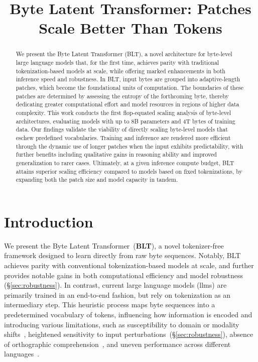 \title{Byte Latent Transformer: Patches Scale Better Than Tokens}

\begin{abstract}
We present the Byte Latent Transformer ({\textsc BLT}), a novel architecture for byte-level large language models that, for the first time, achieves parity with traditional tokenization-based models at scale, while offering marked enhancements in both inference speed and robustness. In {\textsc BLT}, input bytes are grouped into adaptive-length patches, which become the foundational units of computation. The boundaries of these patches are determined by assessing the entropy of the forthcoming byte, thereby dedicating greater computational effort and model resources in regions of higher data complexity. This work conducts the first flop-equated scaling analysis of byte-level architectures, evaluating models with up to 8B parameters and 4T bytes of training data. Our findings validate the viability of directly scaling byte-level models that eschew predefined vocabularies. Training and inference are rendered more efficient through the dynamic use of longer patches when the input exhibits predictability, with further benefits including qualitative gains in reasoning ability and improved generalization to rarer cases. Ultimately, at a given inference compute budget, {\textsc BLT} attains superior scaling efficiency compared to models based on fixed tokenizations, by expanding both the patch size and model capacity in tandem.
\end{abstract}

\section{Introduction}
\label{section:intro}

We present the Byte Latent Transformer~(\textbf{BLT}), a novel tokenizer-free framework designed to learn directly from raw byte sequences. Notably, BLT achieves parity with conventional tokenization-based models at scale, and further provides notable gains in both computational efficiency and model robustness (\S\ref{sec:robustness}). In contrast, current large language models (llms) are primarily trained in an end-to-end fashion, but rely on tokenization as an intermediary step. This heuristic process maps byte sequences into a predetermined vocabulary of tokens, influencing how information is encoded and introducing various limitations, such as susceptibility to domain or modality shifts~\citep{dagangetting}, heightened sensitivity to input perturbations~(\S\ref{sec:robustness}), absence of orthographic comprehension~\citep{edman2024cute}, and uneven performance across different languages~\citep{liang2023xlm,petrov2024language,limisiewicz2024myte}.

